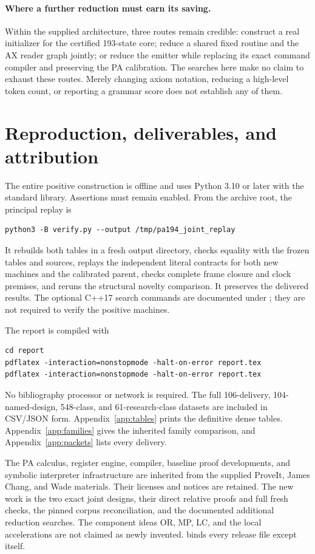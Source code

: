 \documentclass[11pt,a4paper]{article}
\begin{document}
\paragraph{Where a further reduction must earn its saving.}
Within the supplied architecture, three routes remain credible: construct
a real initializer for the certified 193-state core; reduce a shared fixed
routine and the AX reader graph jointly; or reduce the emitter while
replacing its exact command compiler and preserving the PA calibration.
The searches here make no claim to exhaust these routes. Merely changing
axiom notation, reducing a high-level token count, or reporting a grammar
score does not establish any of them.

\section{Reproduction, deliverables, and attribution}

The entire positive construction is offline and uses Python 3.10 or later
with the standard library. Assertions must remain enabled. From the archive
root, the principal replay is
\begin{verbatim}
python3 -B verify.py --output /tmp/pa194_joint_replay
\end{verbatim}
It rebuilds both tables in a fresh output directory, checks equality with
the frozen tables and sources, replays the independent literal contracts
for both new machines and the calibrated parent, checks complete frame
closure and clock premises, and reruns the structural novelty comparison.
It preserves the delivered results. The optional C++17 search commands
are documented under ; they are not required to verify the
positive machines.

The report is compiled with
\begin{verbatim}
cd report
pdflatex -interaction=nonstopmode -halt-on-error report.tex
pdflatex -interaction=nonstopmode -halt-on-error report.tex
\end{verbatim}
No bibliography processor or network is required. The full 106-delivery,
104-named-design, 548-class, and 61-research-class datasets are included in
CSV/JSON form. Appendix~\ref{app:tables} prints the definitive dense
tables. Appendix~\ref{app:families} gives the inherited family comparison,
and Appendix~\ref{app:packets} lists every delivery.

The PA calculus, register engine, compiler, baseline proof developments,
and symbolic interpreter infrastructure are inherited from the supplied
ProveIt, James Chang, and Wade materials. Their licenses and notices are
retained. The new work is the two exact joint designs, their direct
relative proofs and full fresh checks, the pinned corpus reconciliation,
and the documented additional reduction searches. The component ideas
OR, MP, LC, and the local accelerations are not claimed as newly invented.
 binds every release file except itself.
\end{document}
